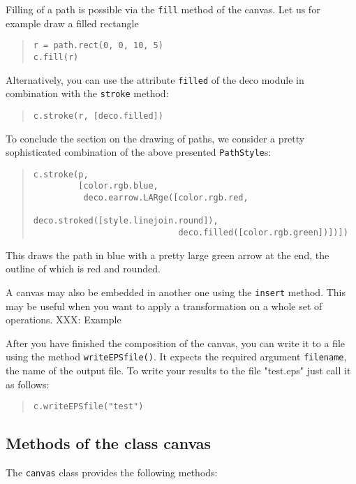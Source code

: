Filling of a path is possible via the \verb|fill| method of the canvas.
Let us for example draw a filled rectangle 
\begin{quote}
\begin{verbatim}
r = path.rect(0, 0, 10, 5)
c.fill(r)
\end{verbatim}
\end{quote}
Alternatively, you can use the attribute \verb|filled| of the deco module
in combination with the \verb|stroke| method:
\begin{quote}
\begin{verbatim}
c.stroke(r, [deco.filled])
\end{verbatim}
\end{quote}

To conclude the section on the drawing of paths, we consider a pretty
sophisticated combination of the above presented \verb|PathStyle|s:
\begin{quote}
\begin{verbatim}
c.stroke(p,
         [color.rgb.blue,
          deco.earrow.LARge([color.rgb.red,
                             deco.stroked([style.linejoin.round]),
                             deco.filled([color.rgb.green])])])
\end{verbatim}
\end{quote}
This draws the path in blue with a pretty large green arrow at the
end, the outline of which is red and rounded.

A canvas may also be embedded in another one using the \texttt{insert}
method. This may be useful when you want to apply a transformation on
a whole set of operations. XXX: Example

After you have finished the composition of the canvas, you can
write it to a file using the method \verb|writeEPSfile()|. It expects the
required argument \verb|filename|, the name of the output
file. To write your results to the file "test.eps" just call it as follows:
\begin{quote}
\begin{verbatim}
c.writeEPSfile("test")
\end{verbatim}
\end{quote}


\subsection{Methods of the class canvas}

The \verb|canvas| class provides the following methods:

